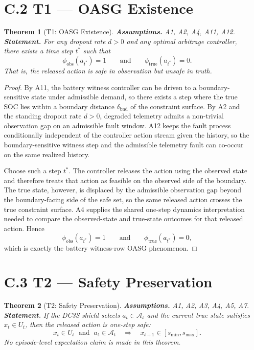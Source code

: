 \documentclass[11pt]{article}
\newtheorem{theorem}{Theorem}
\newcommand{\1}{\mathbf{1}}
\begin{document}
\newpage

\section*{C.2 T1 --- OASG Existence}

\begin{theorem}[T1: OASG Existence]\label{thm:t1}
\textbf{Assumptions.} A1, A2, A4, A11, A12. \\
\textbf{Statement.} For any dropout rate $d>0$ and any optimal arbitrage
controller, there exists a time step $t^*$ such that
\[
  \phi_{\mathrm{obs}}(a_{t^*}) = 1
  \qquad\text{and}\qquad
  \phi_{\mathrm{true}}(a_{t^*}) = 0.
\]
That is, the released action is safe in observation but unsafe in truth.
\end{theorem}

\begin{proof}
By A11, the battery witness controller can be driven to a boundary-sensitive
state under admissible demand, so there exists a step where the true SOC lies
within a boundary distance $\delta_{\mathrm{bnd}}$ of the constraint surface.
By A2 and the standing dropout rate $d>0$, degraded telemetry admits a
non-trivial observation gap on an admissible fault window. A12 keeps the fault
process conditionally independent of the controller action stream given the
history, so the boundary-sensitive witness step and the admissible telemetry
fault can co-occur on the same realized history.

Choose such a step $t^*$. The controller releases the action using the observed
state and therefore treats that action as feasible on the observed side of the
boundary. The true state, however, is displaced by the admissible observation
gap beyond the boundary-facing side of the safe set, so the same released
action crosses the true constraint surface. A4 supplies the shared one-step
dynamics interpretation needed to compare the observed-state and true-state
outcomes for that released action. Hence
\[
  \phi_{\mathrm{obs}}(a_{t^*}) = 1
  \qquad\text{and}\qquad
  \phi_{\mathrm{true}}(a_{t^*}) = 0,
\]
which is exactly the battery witness-row OASG phenomenon. \qedhere
\end{proof}

\section*{C.3 T2 --- Safety Preservation}

\begin{theorem}[T2: Safety Preservation]\label{thm:t2}
\textbf{Assumptions.} A1, A2, A3, A4, A5, A7. \\
\textbf{Statement.} If the DC3S shield selects $a_t \in \mathcal{A}_t$ and
the current true state satisfies $x_t \in U_t$, then the released action is
one-step safe:
\[
  x_t \in U_t \;\text{ and }\; a_t \in \mathcal{A}_t
  \quad\Longrightarrow\quad
  x_{t+1} \in [s_{\min}, s_{\max}].
\]
No episode-level expectation claim is made in this theorem.
\end{theorem}
\end{document}
